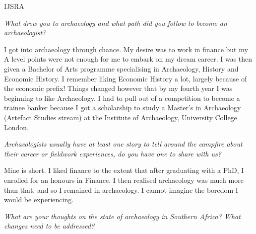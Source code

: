 \begin{labeling}{IJSRA}	
\item[IJSRA (International Journal of Student Research in Archaeology)] \emph{What drew you to archaeology and what path did you follow to become an archaeologist? }
	
\item[Shadreck Chirikure (SC)] I got into archaeology through chance. My desire was to work in finance but my A level points were not enough for me to embark on my dream career. I was then given a Bachelor of Arts programme specialising in Archaeology, History and Economic History. I remember liking Economic History a lot, largely because of the economic prefix! Things changed however that by my fourth year I was beginning to like Archaeology. I had to pull out of a competition to become a trainee banker because I got a scholarship to study a Master’s in Archaeology (Artefact Studies stream) at the Institute of Archaeology, University College London.


\item[IJSRA] \emph{Archaeologists usually have at least one story to tell around the campfire about their career or fieldwork experiences, do you have one to share with us?}
	
\item[SC] Mine is short. I liked finance to the extent that after graduating with a PhD, I enrolled for an honours in Finance. I then realised archaeology was much more than that, and so I remained in archaeology. I cannot imagine the boredom I would be experiencing.

\item[IJSRA] \emph{What are your thoughts on the state of archaeology in Southern Africa? What changes need to be addressed?}
	

\end{labeling}

